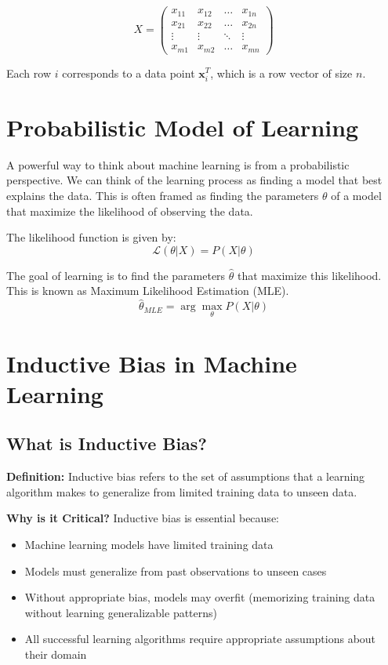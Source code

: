 $$ 
 X = \begin{pmatrix}
 x_{11} & x_{12} & \dots & x_{1n} \\
x_{21} & x_{22} & \dots & x_{2n} \\
\vdots & \vdots & \ddots & \vdots \\
x_{m1} & x_{m2} & \dots & x_{mn}
\end{pmatrix}
$$ 

Each row $i$ corresponds to a data point $\mathbf{x}_i^T$, which is a row vector of size $n$.

\section{Probabilistic Model of Learning}
A powerful way to think about machine learning is from a probabilistic perspective. We can think of the learning process as finding a model that best explains the data. This is often framed as finding the parameters $\theta$ of a model that maximize the likelihood of observing the data.

The likelihood function is given by:
$$ 
\mathcal{L}(\theta | X) = P(X | \theta) 
$$ 

The goal of learning is to find the parameters $\hat{\theta}$ that maximize this likelihood. This is known as Maximum Likelihood Estimation (MLE).
$$ 
\hat{\theta}_{MLE} = \arg\max_{\theta} P(X | \theta)
$$ 

\section{Inductive Bias in Machine Learning}
\subsection{What is Inductive Bias?}
\textbf{Definition:} Inductive bias refers to the set of assumptions that a learning algorithm makes to generalize from limited training data to unseen data.

\textbf{Why is it Critical?}
Inductive bias is essential because:
\begin{itemize}
    \item Machine learning models have limited training data
    \item Models must generalize from past observations to unseen cases
    \item Without appropriate bias, models may overfit (memorizing training data without learning generalizable patterns)
    \item All successful learning algorithms require appropriate assumptions about their domain
\end{itemize}

